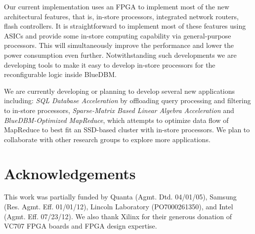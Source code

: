 \documentclass[pageno]{jpaper}
\begin{document}
Our current implementation uses an FPGA to implement most of the new
architectural features, that is, in-store processors, integrated network
routers, flash controllers. It is straightforward to implement most of these
features using ASICs and provide some in-store computing capability via
general-purpose processors. This will simultaneously improve the performance
and lower the power consumption even further. Notwithstanding such developments
we are developing tools to make it easy to develop in-store processors for the
reconfigurable logic inside BlueDBM.  



We are currently developing or planning to develop several new applications
including:  
\emph{SQL Database Acceleration} by offloading query processing and
filtering to in-store processors,
\emph{Sparse-Matrix Based Linear Algebra Acceleration} and
\emph{BlueDBM-Optimized MapReduce}, which attempts to optimize data
flow of MapReduce to best fit an SSD-based cluster with in-store processors.
We plan to collaborate with other research groups to explore more applications.

\section{Acknowledgements}
This work was partially funded by Quanta (Agmt. Dtd. 04/01/05), Samsung (Res.
Agmt. Eff. 01/01/12), Lincoln Laboratory (PO7000261350), and Intel (Agmt. Eff.
07/23/12). We also thank Xilinx for
their generous donation of VC707 FPGA boards and FPGA design expertise.

\vfill



\end{document}
